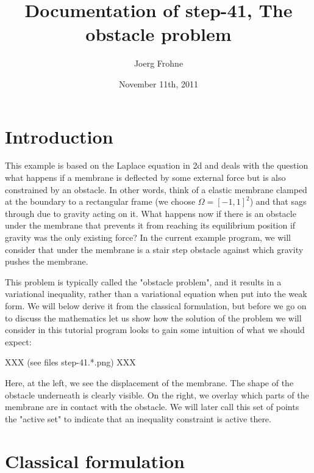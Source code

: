 \documentclass{article}
\title{Documentation of step-41, The obstacle problem}
\author{Joerg Frohne}
\date{November 11th, 2011}
\begin{document}
\maketitle

\section{Introduction}

This example is based on the Laplace equation in 2d and deals with the
question what happens if a membrane is deflected by some external force but is
also constrained by an obstacle. In other words, think of a elastic membrane
clamped at the boundary to a rectangular frame (we choose $\Omega =
\left[-1,1\right]^2$) and that sags through due to gravity acting on it. What
happens now if there is an obstacle under the membrane that prevents it from
reaching its equilibrium position if gravity was the only existing force? In
the current example program, we will consider that under the membrane is a
stair step obstacle against which gravity pushes the membrane.

This problem is typically called the "obstacle problem", and it results in a
variational inequality, rather than a variational equation when put into the
weak form. We will below derive it from the classical formulation, but before we
go on to discuss the mathematics let us show how the solution of the problem we
will consider in this tutorial program looks to gain some intuition of what
we should expect:

XXX (see files step-41.*.png) XXX

Here, at the left, we see the displacement of the membrane. The shape
of the obstacle underneath is clearly visible. On the right, we overlay which
parts of the membrane are in contact with the obstacle. We will later call
this set of points the "active set" to indicate that an inequality constraint
is active there.


\section{Classical formulation}
\end{document}
